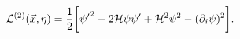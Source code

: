 \begin{equation}
{\cal L}^{(2)}(\vec{x},\eta) = \frac{1}{2} \biggl[ {\psi'}^2 - 2 {\cal H} \psi\psi' + 
{\cal H}^2 \psi^2 - (\partial_{i} \psi)^2\biggr].
\label{L1}
\end{equation}

